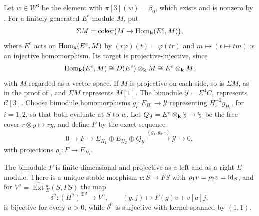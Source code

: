 Let ${w\in W^3}$ be the element with ${\pi[3](w)=\beta_0}$, which exists and is
nonzero by . For a finitely generated
$E^e$-module $M$, put
\[
  \Sigma M=\operatorname{coker}\bigl(M\to\Hom[\kk]{E^e}{M}\bigr),
\]
where $E^e$ acts on $\Hom[\kk]{E^e}{M}$ by ${(r\varphi)(t)=\varphi(tr)}$ and
${m\mapsto(t\mapsto tm)}$ is an injective homomorphism. Its target is
projective-injective, since
\[
  \Hom[\kk]{E^e}{M}\cong D(E^e)\otimes_\kk M\cong E^e\otimes_\kk M,
\]
with $M$ regarded as a vector space. If $M$ is projective on each side, so is
$\Sigma M$, as in the proof of , and $\Sigma M$ represents
$M[1]$. The bimodule ${\mathcal{Y}=\Sigma^4C_1}$ represents $\mathcal{C}[3]$.
Choose bimodule homomorphisms ${g_i\colon E_{H_i}\to\mathcal{Y}}$ representing
$H_i^{-2}g_{H_i}$, for ${i=1,2}$, so that both evaluate at $S$ to $w$. Let
${Q_{\mathcal{Y}}=E^e\otimes_{\mathbf{k}}\mathcal{Y}\to\mathcal{Y}}$ be the free cover
${r\otimes y\mapsto ry}$, and define $F$ by the exact sequence
\begin{equation}
  \label{eq:fibre}
  0\longrightarrow F\longrightarrow E_{H_1}\oplus E_{H_2}\oplus Q_{\mathcal{Y}}
  \xrightarrow{(g_1,g_2,\cdot)}\mathcal{Y}\longrightarrow0,
\end{equation}
with projections ${\rho_i\colon F\to E_{H_i}}$.

\begin{proposition}
  \label{prop:fibre}
  The bimodule $F$ is finite-dimensional and projective as a left and as a
  right $E$-module. There is a unique stable morphism ${v\colon S\to FS}$ with
  ${\rho_1v=\rho_2v=\id[S]}$, and for ${V^a=\widehat{\operatorname{Ext}}{}^a_E
  (S,FS)}$ the map
  \[
    \delta^a\colon(H^a)^{\oplus2}\longrightarrow V^a,\qquad
    (g,j)\longmapsto F(g)v+v[a]j,
  \]
  is bijective for every ${a>0}$, while $\delta^0$ is surjective with kernel
  spanned by $(1,1)$.
\end{proposition}

